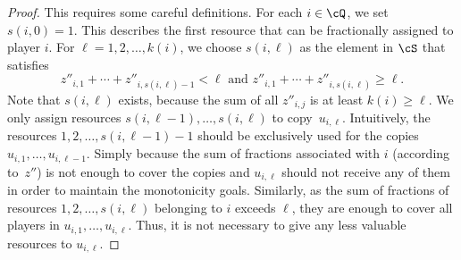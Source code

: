 \begin{proof}
    This requires some careful definitions.
    For each $i\in \cQ$, we set
    $s(i,0) = 1$. This describes the first resource that
    can be fractionally assigned to player $i$.
    For $\ell = 1,2,\dotsc,k(i)$,
    we choose $s(i,\ell)$ as the element in $\cS$ that satisfies
    \begin{equation*}
        z''_{i,1} + \cdots + z''_{i,s(i,\ell)-1} < \ell
        \text{ and }
        z''_{i,1} + \cdots + z''_{i,s(i,\ell)} \ge \ell .
    \end{equation*}
    Note that $s(i,\ell)$ exists, because the sum of
    all $z''_{i,j}$ is at least $k(i) \ge \ell$.
    We only assign resources $s(i,\ell-1),\dotsc,s(i,\ell)$ to copy~$u_{i,\ell}$.
    Intuitively, the resources $1,2,\dotsc,s(i,\ell-1)-1$ should be exclusively used for the copies $u_{i,1},\dotsc,u_{i,\ell-1}$. Simply because the sum of fractions associated with $i$ (according to~$z''$) is not enough to cover the copies and $u_{i,\ell}$ should not receive any of them in order to maintain the monotonicity goals.
    Similarly, as the sum of fractions
    of resources $1,2,\dotsc,s(i,\ell)$ belonging to $i$
    exceeds $\ell$, they are enough to cover all players in
    $u_{i,1},\dotsc,u_{i,\ell}$.
    Thus, it is not necessary to give any less valuable resources to 
    $u_{i,\ell}$.


\end{proof}
